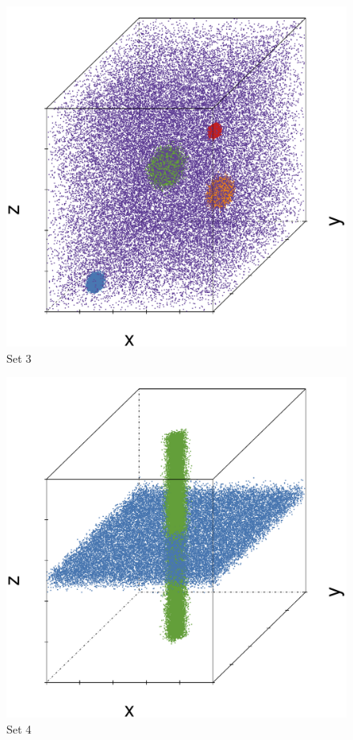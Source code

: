 \begin{subfigure}{0.18\textwidth}
	\centering
	\includegraphics[width=\textwidth]{3/img/datasetplot_ferdosi_3_120000.pdf}
	\caption{Set 3}
	\label{fig:3:simulated:datasets:ferdosi3}
\end{subfigure}		
\begin{subfigure}{0.18\textwidth}
	\centering
	\includegraphics[width=\textwidth]{3/img/datasetplot_ferdosi_4_60000.pdf}
	\caption{Set 4}
	\label{fig:3:simulated:datasets:ferdosi4}
\end{subfigure}			
